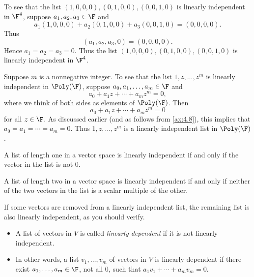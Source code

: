 \begin{example}\label{ax:2.16}\leavevmode
\begin{parts}
\item To see that the list $(1,0,0,0),(0,1,0,0),(0,0,1,0)$ is linearly
  independent in $\F^4$, suppose $a_1,a_2,a_3\in\F$ and
  \[ a_1(1,0,0,0)+a_2(0,1,0,0)+a_3(0,0,1,0) = (0,0,0,0). \]
  Thus
  \[ (a_1,a_2,a_3,0) = (0,0,0,0). \]
  Hence $a_1=a_2=a_3=0$. Thus the list $(1,0,0,0),(0,1,0,0),(0,0,1,0)$ is
  linearly independent in $\F^4$.
\item Suppose $m$ is a nonnegative integer. To see that the list
  $1,z,\dots,z^m$ is linearly independent in $\Poly(\F)$, suppose
  $a_0,a_1,\dots,a_m\in\F$ and
  \[ a_0+a_1z+\cdots+a_mz^m = 0, \]
  where we think of both sides as elements of $\Poly(\F)$. Then
  \[ a_0+a_1z+\cdots+a_mz^m = 0 \]
  for all $z\in\F$. As discussed earlier (and as follows from \ref{ax:4.8}),
  this implies that $a_0=a_1=\cdots=a_m=0$. Thus $1,z,\dots,z^m$ is a linearly
  independent list in $\Poly(\F)$.
\item A list of length one in a vector space is linearly independent if and
  only if the vector in the list is not $0$.
\item A list of length two in a vector space is linearly independent if and
  only if neither of the two vectors in the list is a scalar multiple of the
  other.
\end{parts}
\end{example}

If some vectors are removed from a linearly independent list, the remaining
list is also linearly independent, as you should verify.

\begin{definition}\label{ax:2.17}\leavevmode
\begin{itemize}
\item A list of vectors in $V$ is called \emph{linearly dependent} if it is not
  linearly independent.
\item In other words, a list $v_1,\dots,v_m$ of vectors in $V$ is linearly
  dependent if there exist $a_1,\dots,a_m\in\F$, not all $0$, such that
  $a_1v_1+\cdots+a_mv_m=0$.
\end{itemize}
\end{definition}

